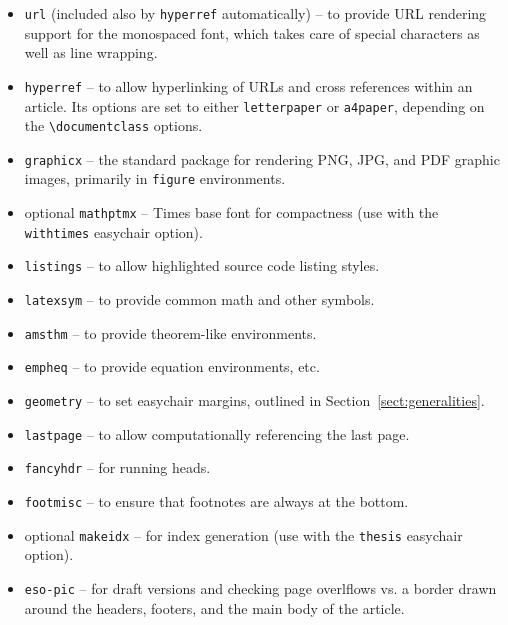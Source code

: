 \documentclass{easychair}
\newcommand{\easychair}{\textsf{easychair}}
\begin{document}
\begin{itemize}
\item
\texttt{url} \cite{url-package} (included also by \texttt{hyperref} automatically) -- to provide URL rendering support for the
monospaced font, which takes care of special characters as well as line 
wrapping.

\item
\texttt{hyperref} \cite{hyperref-package} -- to allow hyperlinking of URLs and
cross references within an article.
Its options are set to either \verb+letterpaper+ or \verb+a4paper+, depending
on the \verb+\documentclass+ options.

\item
\texttt{graphicx} \cite{graphicx-package} -- the standard package for rendering
PNG, JPG, and PDF graphic images, primarily in \texttt{figure} environments.

\item
optional \texttt{mathptmx} \cite{mathptmx-package} -- Times base font for compactness
(use with the \texttt{withtimes} {\easychair} option).

\item
\texttt{listings} \cite{listings-package} -- to allow highlighted source code 
listing styles.

\item
\texttt{latexsym} \cite{latexsym-package} -- to provide common math and other 
symbols.

\item
\texttt{amsthm} \cite{amsthm-package} -- to provide {\AmS} theorem-like 
environments.

\item
\texttt{empheq} \cite{empheq-package} -- to provide equation environments, etc.

\item
\texttt{geometry} \cite{geometry-package} -- to set {\easychair} margins, 
outlined in Section~\ref{sect:generalities}.

\item
\texttt{lastpage} \cite{lastpage-package} -- to allow computationally
referencing the last page.

\item
\texttt{fancyhdr} \cite{fancyhdr-package} -- for running heads.

\item
\texttt{footmisc} \cite{footmisc-package} -- to ensure that footnotes are
always at the bottom.

\item
optional \texttt{makeidx} \cite{makeidx-package} -- for index generation
(use with the \texttt{thesis} {\easychair} option).

\item
\texttt{eso-pic} \cite{eso-pic-package} -- for draft versions and checking page
overlflows vs. a border drawn around the headers, footers, and the main body of
the article.

\end{itemize}
\end{document}
